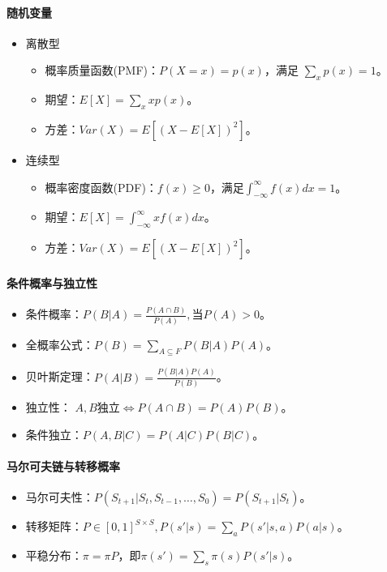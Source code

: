 \documentclass[
12pt, %
a4paper, 
oneside, %
headinclude,footinclude, %
]{scrartcl}
\begin{document}
\paragraph*{随机变量}
\begin{itemize}
\item 离散型
\begin{itemize}
\item 概率质量函数(PMF)：$ P(X = x) = p(x) $，满足 $ \sum_{x} p(x) = 1 $。
\item 期望：$ E[X] = \sum_{x} x p(x) $。
\item 方差：$ Var(X) = E[(X - E[X])^2] $。
\end{itemize}
\item 连续型
\begin{itemize}
\item 概率密度函数(PDF)：$ f(x) \geq 0 $，满足$ \int_{-\infty}^{\infty} f(x) dx = 1 $。
\item 期望：$ E[X] = \int_{-\infty}^{\infty} x f(x) dx $。
\item 方差：$ Var(X) = E[(X - E[X])^2] $。
\end{itemize}
\end{itemize}
\paragraph*{条件概率与独立性}
\begin{itemize}
\item 条件概率：$ P(B|A) = \frac{P(A \cap B)}{P(A)}, \text{当} P(A) > 0 $。
\item 全概率公式：$ P(B) = \sum_{A \subseteq F} P(B|A) P(A) $。
\item 贝叶斯定理：$ P(A|B) = \frac{P(B|A) P(A)}{P(B)} $。
\item 独立性： $ A,B $独立$ \iff P(A \cap B) = P(A)P(B) $。
\item 条件独立：$ P(A ,B|C) = P(A|C)P(B|C) $。
\end{itemize}
\paragraph*{马尔可夫链与转移概率}
\begin{itemize}
\item 马尔可夫性：$ P(S_{t + 1}|S_t, S_{t - 1}, \dots, S_0) = P(S_{t + 1}|S_t) $。
\item 转移矩阵：$ P \in [0,1]^{S \times S}, P(s'|s) = \sum_{a} P(s'|s, a) P(a|s) $。
\item 平稳分布：$ \pi = \pi P $，即$ \pi(s') = \sum_{s} \pi(s) P(s'|s) $。
\end{itemize}
\end{document}
